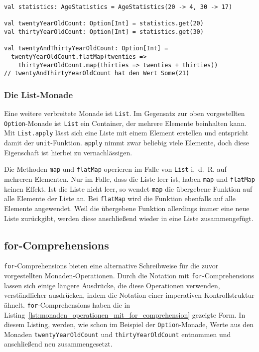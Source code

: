 \begin{lstlisting}[caption=Die Option-Monade, label=lst:die_option_monade]
val statistics: AgeStatistics = AgeStatistics(20 -> 4, 30 -> 17)

val twentyYearOldCount: Option[Int] = statistics.get(20)
val thirtyYearOldCount: Option[Int] = statistics.get(30)

val twentyAndThirtyYearOldCount: Option[Int] =
  twentyYearOldCount.flatMap(twenties =>
    thirtyYearOldCount.map(thirties => twenties + thirties))
// twentyAndThirtyYearOldCount hat den Wert Some(21)
\end{lstlisting}


\subsubsection{Die List-Monade} %
\label{ssub:die_list_monade}

Eine weitere verbreitete Monade ist \lstinline|List|.
Im Gegensatz zur oben vorgestellten \lstinline|Option|-Monade ist \lstinline|List| ein Container, der mehrere Elemente beinhalten kann.
Mit \lstinline|List.apply| lässt sich eine Liste mit einem Element erstellen und entspricht damit der \lstinline|unit|-Funktion.
\lstinline|apply| nimmt zwar beliebig viele Elemente, doch diese Eigenschaft ist hierbei zu vernachlässigen.

Die Methoden \lstinline|map| und \lstinline|flatMap| operieren im Falle von \lstinline|List| i.~d.~R. auf mehreren Elementen.
Nur im Falle, dass die Liste leer ist, haben \lstinline|map| und \lstinline|flatMap| keinen Effekt.
Ist die Liste nicht leer, so wendet \lstinline|map| die übergebene Funktion auf alle Elemente der Liste an.
Bei \lstinline|flatMap| wird die Funktion ebenfalls auf alle Elemente angewendet.
Weil die übergebene Funktion allerdings immer eine neue Liste zurückgibt, werden diese anschließend wieder in eine Liste zusammengefügt.



\subsection{for-Comprehensions} %
\label{sub:for_comprehensions}

\lstinline|for|-Comprehensions bieten eine alternative Schreibweise für die zuvor vorgestellten Monaden-Operationen.
Durch die Notation mit \lstinline|for|-Comprehensions lassen sich einige längere Ausdrücke, die diese Operationen verwenden, verständlicher ausdrücken, indem die Notation einer imperativen Kontrollstruktur ähnelt.
\lstinline|for|-Comprehensions haben die in Listing~\ref{lst:monaden_operationen_mit_for_comprehension} gezeigte Form.
In diesem Listing, werden, wie schon im Beispiel der \lstinline|Option|-Monade, Werte aus den Monaden \lstinline|twentyYearOldCount| und \lstinline|thirtyYearOldCount| entnommen und anschließend neu zusammengesetzt.

